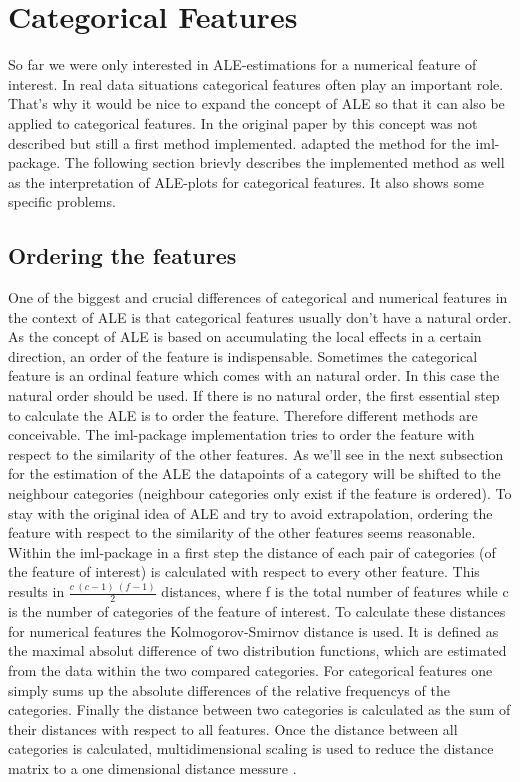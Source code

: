 \documentclass[
]{krantz}
\begin{document}
\hypertarget{categorical-features}{%
\section{Categorical Features}\label{categorical-features}}

So far we were only interested in ALE-estimations for a numerical feature of interest. In real data situations categorical features often play an important role. That's why it would be nice to expand the concept of ALE so that it can also be applied to categorical features. In the original paper by \citep{Apley2016} this concept was not described but still a first method implemented. \citep{molnar2019} adapted the method for the iml-package. The following section brievly describes the implemented method as well as the interpretation of ALE-plots for categorical features. It also shows some specific problems.

\hypertarget{ordering-the-features}{%
\subsection{Ordering the features}\label{ordering-the-features}}

One of the biggest and crucial differences of categorical and numerical features in the context of ALE is that categorical features usually don't have a natural order. As the concept of ALE is based on accumulating the local effects in a certain direction, an order of the feature is indispensable. Sometimes the categorical feature is an ordinal feature which comes with an natural order. In this case the natural order should be used. If there is no natural order, the first essential step to calculate the ALE is to order the feature. Therefore different methods are conceivable. The iml-package implementation tries to order the feature with respect to the similarity of the other features. As we'll see in the next subsection for the estimation of the ALE the datapoints of a category will be shifted to the neighbour categories (neighbour categories only exist if the feature is ordered). To stay with the original idea of ALE and try to avoid extrapolation, ordering the feature with respect to the similarity of the other features seems reasonable. Within the iml-package in a first step the distance of each pair of categories (of the feature of interest) is calculated with respect to every other feature. This results in \(\frac{c~(c-1)~(f-1)}{2}\) distances, where f is the total number of features while c is the number of categories of the feature of interest. To calculate these distances for numerical features the Kolmogorov-Smirnov distance is used. It is defined as the maximal absolut difference of two distribution functions, which are estimated from the data within the two compared categories. For categorical features one simply sums up the absolute differences of the relative frequencys of the categories.
Finally the distance between two categories is calculated as the sum of their distances with respect to all features.
Once the distance between all categories is calculated, multidimensional scaling is used to reduce the distance matrix to a one dimensional distance messure \citep{molnar2019}.
\end{document}
